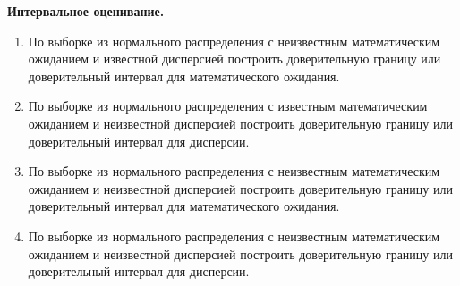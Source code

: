 \documentclass[a4paper,12pt]{article}
\newcommand{\theme}[1]{\hfil \textbf{#1} \hfil}
\begin{document}
\theme{Интервальное оценивание.}
\begin{enumerate}[resume]
    \item По выборке из нормального распределения с неизвестным математическим ожиданием и известной дисперсией построить доверительную границу
          или доверительный интервал для математического ожидания.
    \item По выборке из нормального распределения с известным математическим ожиданием и неизвестной дисперсией построить доверительную границу
          или доверительный интервал для дисперсии.
    \item По выборке из нормального распределения с неизвестным математическим ожиданием и неизвестной дисперсией построить доверительную границу
          или доверительный интервал для математического ожидания.
    \item По выборке из нормального распределения с неизвестным математическим ожиданием и неизвестной дисперсией построить доверительную границу
          или доверительный интервал для дисперсии.
\end{enumerate}
\end{document}
